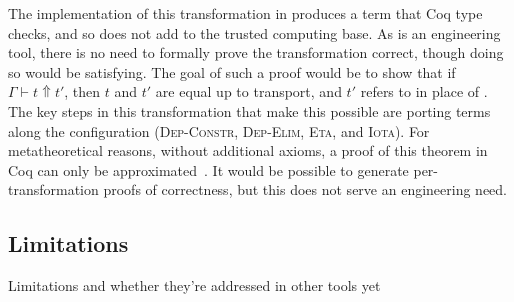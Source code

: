 The implementation of this transformation in \toolnamec produces a term that Coq type checks, and so does not
add to the trusted computing base.
As \toolnamec is an engineering tool, there is no need to formally prove the transformation correct, though doing so would be satisfying.
The goal of such a proof would be to show that %
if $\Gamma \vdash t \Uparrow t'$,
then $t$ and $t'$ are equal up to transport, and $t'$ refers to \B in place of \Aa.
The key steps in this transformation that make this possible are porting terms along the configuration %
(\textsc{Dep-Constr}, \textsc{Dep-Elim}, \textsc{Eta}, and \textsc{Iota}).
For metatheoretical reasons, without additional axioms, a proof of this theorem in Coq can only be approximated~\cite{tabareau2017equivalences}.
It would be possible to generate per-transformation proofs of correctness, but this does not serve an engineering need.

\subsection{Limitations}

Limitations and whether they're addressed in other tools yet
